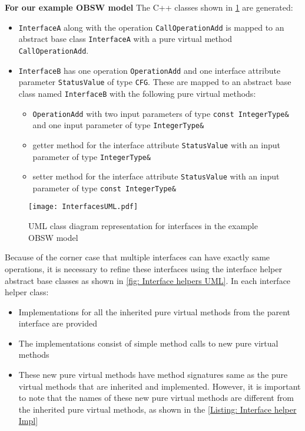 \textbf{For our example OBSW model} The C++ classes shown in \cref{fig: InterfacesUML} are generated:
\begin{itemize}
\item \texttt{InterfaceA} along with the operation \texttt{CallOperationAdd} is mapped to an abstract base class \texttt{InterfaceA} with a pure virtual method \texttt{CallOperationAdd}. 
\item \texttt{InterfaceB} has one operation \texttt{OperationAdd} and one interface attribute parameter \texttt{StatusValue} of type \texttt{CFG}. These are mapped to an abstract base class named \texttt{InterfaceB} with the following pure virtual methods:
\begin{itemize}
\item \texttt{OperationAdd} with two input parameters of type \texttt{const\allowbreak \ IntegerType\&} and one input parameter of type \texttt{IntegerType\&}
\item getter method for the interface attribute \texttt{StatusValue} with an input parameter of type \texttt{IntegerType\&}
\item setter method for the interface attribute \texttt{StatusValue} with an input parameter of type \texttt{const\allowbreak \ IntegerType\&}
\end{itemize} 
\end{itemize}

\begin{figure}[h]
	\centering
	\texttt{[image: InterfacesUML.pdf]}
	\caption{UML class diagram representation for interfaces in the example OBSW model}
	\label{fig: InterfacesUML}
\end{figure}

Because of the corner case that multiple interfaces can have exactly same operations, it is necessary to refine these interfaces using the interface helper abstract base classes as shown in \cref{fig: Interface helpers UML}. In each interface helper class:
\begin{itemize}
\item Implementations for all the inherited pure virtual methods from the parent interface are provided
\item The implementations consist of simple method calls to new pure virtual methods
\item These new pure virtual methods have method signatures same as the pure virtual methods that are inherited and implemented. However, it is important to note that the names of these new pure virtual methods are different from the inherited pure virtual methods, as shown in the \cref{Listing: Interface helper Impl} 
\end{itemize}

